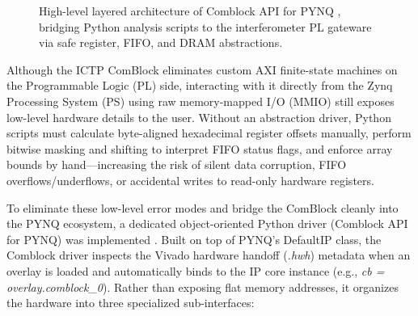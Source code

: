 \begin{figure}[htbp]
{%
}
\caption{High-level layered architecture of Comblock API for PYNQ \cite{gallegoJcgallego1Comblock_API_for_PYNQ2026}, bridging Python analysis scripts to the interferometer PL gateware via safe register, FIFO, and DRAM abstractions.}
\label{fig:comblock_api_arch}
\end{figure}


Although the ICTP ComBlock eliminates custom AXI finite-state machines on the Programmable Logic (PL) side, interacting with it directly from the Zynq Processing System (PS) using raw memory-mapped I/O (MMIO) still exposes low-level hardware details to the user. Without an abstraction driver, Python scripts must calculate byte-aligned hexadecimal register offsets manually, perform bitwise masking and shifting to interpret FIFO status flags, and enforce array bounds by hand—increasing the risk of silent data corruption, FIFO overflows/underflows, or accidental writes to read-only hardware registers.

To eliminate these low-level error modes and bridge the ComBlock cleanly into the PYNQ ecosystem, a dedicated object-oriented Python driver (Comblock API for PYNQ) was implemented \cite[Repository]{gallegoJcgallego1Comblock_API_for_PYNQ2026}. Built on top of PYNQ's DefaultIP class, the Comblock driver inspects the Vivado hardware handoff (\emph{.hwh}) metadata when an overlay is loaded and automatically binds to the IP core instance (e.g., \emph{cb = overlay.comblock\_0}). Rather than exposing flat memory addresses, it organizes the hardware into three specialized sub-interfaces:

